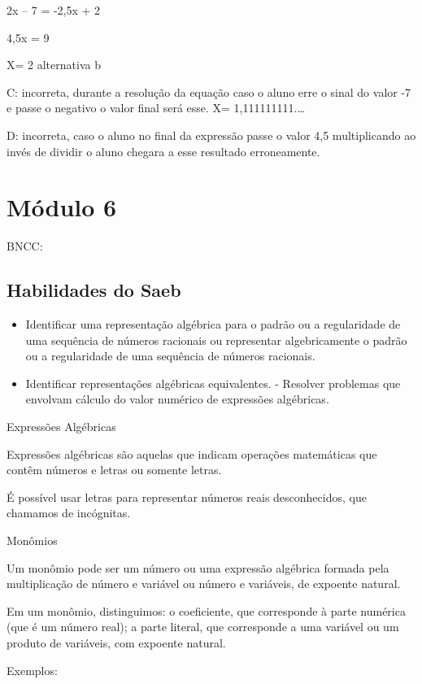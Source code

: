 2x -- 7 = -2,5x + 2

4,5x = 9

X= 2 alternativa b

C: incorreta, durante a resolução da equação caso o aluno erre o sinal
do valor -7 e passe o negativo o valor final será esse. X=
1,111111111.\ldots{}

D: incorreta, caso o aluno no final da expressão passe o valor 4,5
multiplicando ao invés de dividir o aluno chegara a esse resultado
erroneamente.

\chapter{Módulo 6}

BNCC:

\section{Habilidades do Saeb}

\begin{itemize}

\item 
  Identificar uma representação algébrica para o padrão ou a
  regularidade de uma sequência de números racionais ou representar
  algebricamente o padrão ou a regularidade de uma sequência de números
  racionais.

\item 
  Identificar representações algébricas equivalentes. - Resolver
  problemas que envolvam cálculo do valor numérico de expressões
  algébricas.
\end{itemize}

Expressões Algébricas

Expressões algébricas são aquelas que indicam operações matemáticas que
contêm números e letras ou somente letras.

É possível usar letras para representar números reais desconhecidos, que
chamamos de incógnitas.

Monômios

Um monômio pode ser um número ou uma expressão algébrica formada pela
multiplicação de número e variável ou número e variáveis, de expoente
natural.

Em um monômio, distinguimos: o coeficiente, que corresponde à parte
numérica (que é um número real); a parte literal, que corresponde a uma
variável ou um produto de variáveis, com expoente natural.

Exemplos:


